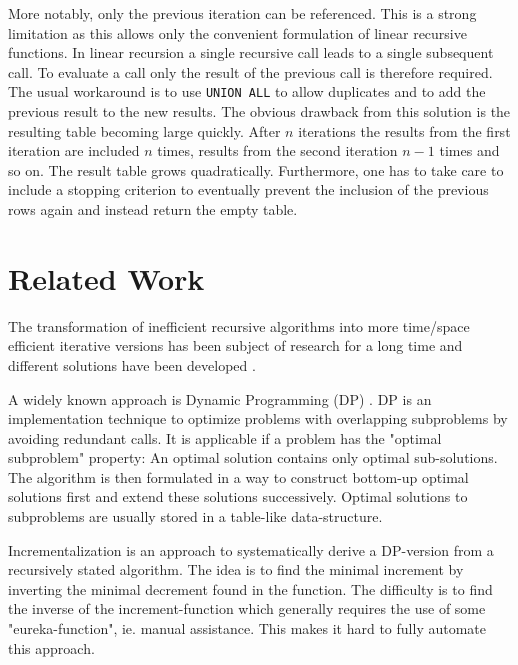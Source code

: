 More notably, only the previous iteration can be referenced. This is a strong limitation as this allows only the convenient formulation of linear recursive functions. In linear recursion a single recursive call leads to a single subsequent call. To evaluate a call only the result of the previous call is therefore required. The usual workaround is to use \texttt{UNION ALL} to allow duplicates and to add the previous result to the new results. The obvious drawback from this solution is the resulting table becoming large quickly. After $n$ iterations the results from the first iteration are included $n$ times, results from the second iteration $n-1$ times and so on. The result table grows quadratically. Furthermore, one has to take care to include a stopping criterion to eventually prevent the inclusion of the previous rows again and instead return the empty table.



\section{Related Work}\label{chapter:related_work}

The transformation of inefficient recursive algorithms into more time/space efficient iterative versions has been subject of research for a long time and different solutions have been developed \cite{redundantRecRemoval, transformingRecProgs, recursionRemoval, changeEvalOrder, programTransformation}.

A widely known approach is Dynamic Programming (DP) \cite{DP_Bellman}. DP is an implementation technique to optimize problems with overlapping subproblems by avoiding redundant calls. It is applicable if a problem has the "optimal subproblem" property: An optimal solution contains only optimal sub-solutions. The algorithm is then formulated in a way to construct bottom-up optimal solutions first and extend these solutions successively. Optimal solutions to subproblems are usually stored in a table-like data-structure. \cite[p. 363 ff.]{Cormen}

Incrementalization is an approach to systematically derive a DP-version from a recursively stated algorithm. The idea is to find the minimal increment by inverting the minimal decrement found in the function. The difficulty is to find the inverse of the increment-function which generally requires the use of some "eureka-function", ie. manual assistance. This makes it hard to fully automate this approach. \cite{incrementalization}

